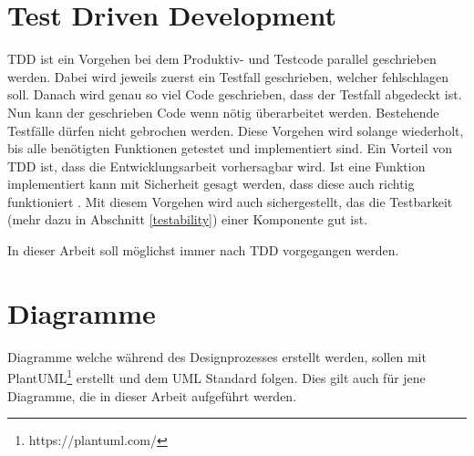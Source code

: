 \section{Test Driven Development} \label{tdd}
\ac{TDD} ist ein Vorgehen bei dem Produktiv- und Testcode parallel geschrieben werden.
Dabei wird jeweils zuerst ein Testfall geschrieben, welcher fehlschlagen soll.
Danach wird genau so viel Code geschrieben, dass der Testfall abgedeckt ist.
Nun kann der geschrieben Code wenn nötig überarbeitet werden.
Bestehende Testfälle dürfen nicht gebrochen werden.
Diese Vorgehen wird solange wiederholt, bis alle benötigten Funktionen getestet und implementiert sind.
Ein Vorteil von \ac{TDD} ist, dass die Entwicklungsarbeit vorhersagbar wird.
Ist eine Funktion implementiert kann mit Sicherheit gesagt werden, dass diese auch richtig funktioniert \parencite{beck2003test}.
Mit diesem Vorgehen wird auch sichergestellt, das die Testbarkeit (mehr dazu in Abschnitt \ref{testability}) einer Komponente gut ist.

In dieser Arbeit soll möglichst immer nach \ac{TDD} vorgegangen werden.


\section{Diagramme}
Diagramme welche während des Designprozesses erstellt werden, sollen mit PlantUML\footnote{https://plantuml.com/} erstellt und dem UML Standard folgen.
Dies gilt auch für jene Diagramme, die in dieser Arbeit aufgeführt werden.